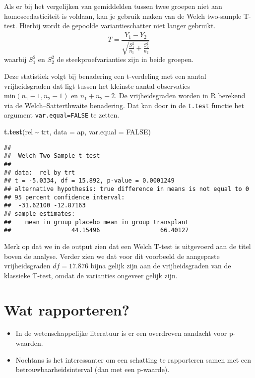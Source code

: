 \documentclass[
  12pt,dutch,coursenotes]{book}
\newenvironment{Shaded}{\begin{snugshade}}{\end{snugshade}}
\newcommand{\DataTypeTok}[1]{\textcolor[rgb]{0.13,0.29,0.53}{#1}}
\newcommand{\KeywordTok}[1]{\textcolor[rgb]{0.13,0.29,0.53}{\textbf{#1}}}
\newcommand{\NormalTok}[1]{#1}
\newcommand{\OperatorTok}[1]{\textcolor[rgb]{0.81,0.36,0.00}{\textbf{#1}}}
\newcommand{\OtherTok}[1]{\textcolor[rgb]{0.56,0.35,0.01}{#1}}
\newcommand{\StringTok}[1]{\textcolor[rgb]{0.31,0.60,0.02}{#1}}
\providecommand{\tightlist}{%
  \setlength{\itemsep}{0pt}\setlength{\parskip}{0pt}}
\theoremstyle{definition}
\theoremstyle{definition}
\theoremstyle{definition}
\theoremstyle{remark}
\begin{document}
Als er bij het vergelijken van gemiddelden tussen twee groepen niet aan homoscedasticiteit is voldaan, kan je gebruik maken van de Welch two-sample T-test.
Hierbij wordt de gepoolde variantieschatter niet langer gebruikt.
\[T =  \frac{\bar{Y}_1 - \bar{Y}_2}{\sqrt{\frac{S^2_1}{n_1}+\frac{S^2_2}{n_2}}}\]
waarbij \(S^2_1\) en \(S^2_2\) de steekproefvarianties zijn in beide groepen.

Deze statistiek volgt bij benadering een t-verdeling met een aantal vrijheidsgraden dat ligt tussen het kleinste aantal observaties \(\text{min}(n_1-1,n_2-1)\) en \(n_1+n_2-2\).
De vrijheidsgraden worden in R berekend via de Welch--Satterthwaite benadering.
Dat kan door in de \texttt{t.test} functie het argument \texttt{var.equal=FALSE} te zetten.

\begin{Shaded}
\begin{Highlighting}[]
\KeywordTok{t.test}\NormalTok{(rel }\OperatorTok{\textasciitilde{}}\StringTok{ }\NormalTok{trt, }\DataTypeTok{data =}\NormalTok{ ap, }\DataTypeTok{var.equal =} \OtherTok{FALSE}\NormalTok{)}
\end{Highlighting}
\end{Shaded}

\begin{verbatim}
## 
## 	Welch Two Sample t-test
## 
## data:  rel by trt
## t = -5.0334, df = 15.892, p-value = 0.0001249
## alternative hypothesis: true difference in means is not equal to 0
## 95 percent confidence interval:
##  -31.62100 -12.87163
## sample estimates:
##    mean in group placebo mean in group transplant 
##                 44.15496                 66.40127
\end{verbatim}

Merk op dat we in de output zien dat een Welch T-test is uitgevoerd aan de titel boven de analyse.
Verder zien we dat voor dit voorbeeld de aangepaste vrijheidsgraden \(df = 17.876\) bijna gelijk zijn aan de vrijheidsgraden van de klassieke T-test, omdat de varianties ongeveer gelijk zijn.

\hypertarget{wat-rapporteren-1}{%
\section{Wat rapporteren?}\label{wat-rapporteren-1}}

\begin{itemize}
\tightlist
\item
  In de wetenschappelijke literatuur is er een overdreven aandacht voor p-waarden.
\item
  Nochtans is het interessanter om een schatting te rapporteren samen met een betrouwbaarheidsinterval (dan met een p-waarde).
\end{itemize}
\end{document}
